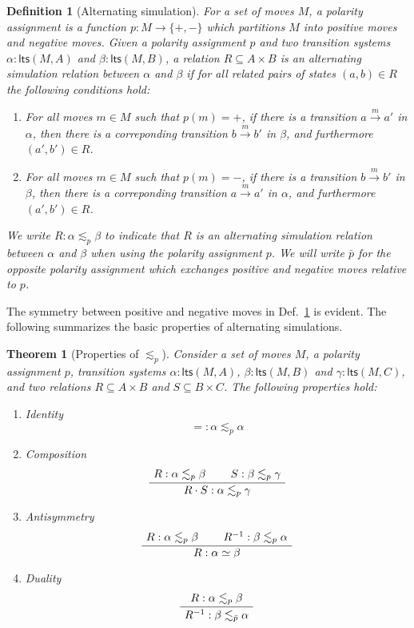 \documentclass[11pt]{article}
\newcommand{\kw}[1]{{\mathsf{#1}}}
\newtheorem{definition}{Definition}
\newtheorem{theorem}{Theorem}
\begin{document}
\begin{definition}[Alternating simulation]
\label{def:altsim}
For a set of moves $M$,
a \emph{polarity assignment} is a function
$p : M \rightarrow \{ +, - \}$
which partitions $M$ into positive moves and negative moves.
Given a polarity assignment $p$
and two transition systems
$\alpha : \kw{lts}(M, A)$ and
$\beta : \kw{lts}(M, B)$,
a relation $R \subseteq A \times B$ is
an \emph{alternating simulation relation} between $\alpha$ and $\beta$
if for all related pairs of states $(a, b) \in R$
the following conditions hold:
\begin{enumerate}
\item For all moves $m \in M$ such that $p(m) = +$,
  if there is a transition
  $a \stackrel{m}{\rightarrow} a'$ in $\alpha$,
  then there is a correponding transition
  $b \stackrel{m}{\rightarrow} b'$ in $\beta$,
  and furthermore $(a', b') \in R$.
\item For all moves $m \in M$ such that $p(m) = -$,
  if there is a transition
  $b \stackrel{m}{\rightarrow} b'$ in $\beta$,
  then there is a correponding transition
  $a \stackrel{m}{\rightarrow} a'$ in $\alpha$,
  and furthermore $(a', b') \in R$.
\end{enumerate}
We write $R : \alpha \lesssim_p \beta$ to indicate that
$R$ is an alternating simulation relation
between $\alpha$ and $\beta$
when using the polarity assignment $p$.
We will write $\bar{p}$ for the opposite polarity assignment
which exchanges positive and negative moves relative to $p$.
\end{definition}

The symmetry between positive and negative moves
in Def.~\ref{def:altsim} is evident.
The following summarizes the basic properties
of alternating simulations.

\begin{theorem}[Properties of $\lesssim_p$]
\label{thm:altsimprops}
Consider a set of moves $M$, a polarity assignment $p$,
transition systems
$\alpha : \kw{lts}(M, A)$,
$\beta : \kw{lts}(M, B)$ and
$\gamma : \kw{lts}(M, C)$,
and two relations $R \subseteq A \times B$ and $S \subseteq B \times C$.
The following properties hold:
\begin{enumerate}
\item Identity
  \[ {=} : \alpha \lesssim_p \alpha \]
\item Composition
  \[ \AxiomC{$R : \alpha \lesssim_p \beta$}
     \AxiomC{$S : \beta \lesssim_p \gamma$}
     \BinaryInfC{$R \cdot S : \alpha \lesssim_p \gamma$}
     \DisplayProof \]
\item Antisymmetry
  \[ \AxiomC{$R : \alpha \lesssim_p \beta$}
     \AxiomC{$R^{-1} : \beta \lesssim_p \alpha$}
     \BinaryInfC{$R : \alpha \simeq \beta$}
     \DisplayProof \]
\item Duality
  \[ \AxiomC{$R : \alpha \lesssim_p \beta$}
     \UnaryInfC{$R^{-1} : \beta \lesssim_{\bar{p}} \alpha$}
     \DisplayProof \]
\end{enumerate}
\end{theorem}
\end{document}
